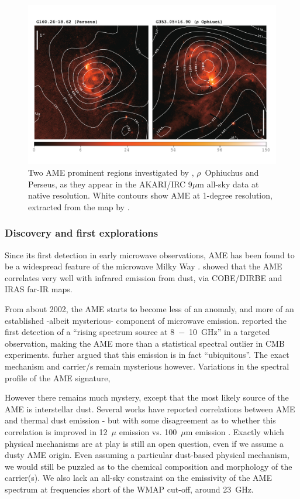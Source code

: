     \begin{figure}
      \centering
      \includegraphics[width=\textwidth]{../Plots/ch_intro/AME_contours.pdf}
        \caption{Two AME prominent regions investigated by \cite{planckxx11, tibbs11}, $\rho$~Ophiuchus and Perseus, as they appear in the AKARI/IRC 9$\mu$m all-sky data at native resolution. White contours show AME at 1-degree resolution, extracted from the map by  \cite{planck15X}.}
      \label{fig:AME-contours}
    \end{figure}

    \subsubsection{Discovery and first explorations}

     Since its first detection in early microwave observations, AME has been found to be a widespread feature of the microwave Milky Way \citep{dickinson13r}. \cite{kogut96,deoliveiracosta97,leitch98} showed that the AME correlates very well with infrared emission from dust, via COBE/DIRBE and IRAS far-IR maps.

     From about 2002, the AME starts to become less of an anomaly, and more of an established -albeit mysterious- component of microwave emission. \cite{finkbeiner02} reported the first detection of a ``rising spectrum source at 8~−~10~GHz'' in a targeted observation, making the AME more than a statistical spectral outlier in CMB experiments. \cite{deoliveiracosta02} furher argued that this emission is in fact ``ubiquitous''. The exact mechanism and carrier/s remain mysterious however. Variations in the spectral profile of the AME signature,

     However there remains much mystery, except that the most likely source of the AME is interstellar dust. Several works have reported correlations between AME and thermal dust emission - but with some disagreement as to whether this correlation is improved in 12~$\mu$ emission vs. 100~$\mu$m emission \citep{ysard10a,tibbs11,hensley16}. Exactly which physical mechanisms are at play is still an open question, even if we assume a dusty AME origin. Even assuming a particular dust-based physical mechanism, we would still be puzzled as to the chemical composition and morphology of the carrier(s). We also lack an all-sky constraint on the emissivity of the AME spectrum at frequencies short of the WMAP cut-off, around 23~GHz.

